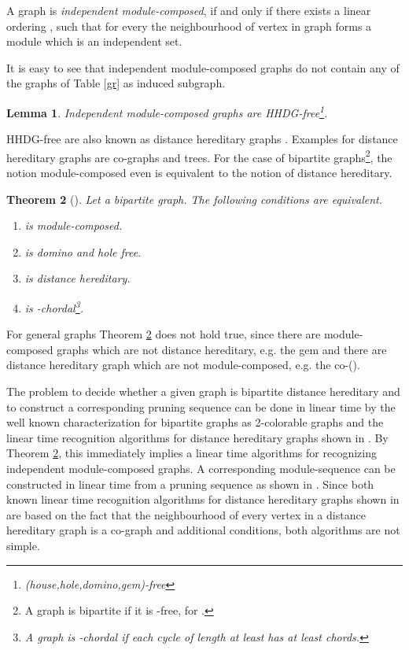 \documentclass[11pt]{article}
\newtheorem{theorem}{Theorem}[section]
\newtheorem{lemma}[theorem]{Lemma}
\begin{document}
A graph  is {\em independent module-composed}, if and only if there exists a linear 
ordering , such that for every  
the neighbourhood of vertex  in graph  
forms a module which is an independent set.



It is easy to see that independent module-composed graphs do not contain
any of the graphs of Table \ref{gr} as induced subgraph.


\begin{lemma}
Independent module-composed graphs are HHDG-free\footnote{(house,hole,domino,gem)-free}.
\end{lemma}

HHDG-free are also known as distance hereditary graphs \cite{HM90,BM86}.
Examples for distance hereditary graphs are co-graphs and trees.
For the case of bipartite graphs\footnote{A graph is bipartite if it is -free, for .}, the notion module-composed 
even is equivalent to the notion of distance hereditary. 

\begin{theorem}[\cite{AGKKW06}]\label{bipm}  Let  a bipartite graph. The following conditions are equivalent.
\begin{enumerate}
\item  is module-composed.

\item  is domino and hole free.

\item  is distance hereditary.

\item  is   -chordal\footnote{ A graph is -chordal if each cycle
of length at least  has at least  chords.}.
\end{enumerate}
\end{theorem}

For general graphs Theorem \ref{bipm} does not hold true, since 
there are module-composed graphs which are not distance hereditary, e.g. the gem and there
are  distance hereditary graph which are not module-composed, e.g. the
co-().










\bigskip
The problem to decide whether a given graph is bipartite distance hereditary
and to construct a corresponding pruning sequence can be done in linear time
by the well known characterization for bipartite graphs as 2-colorable graphs and
the linear time recognition algorithms for distance hereditary graphs shown in \cite{HM90,BM86}.
By Theorem \ref{bipm}, this immediately implies a linear time algorithms for recognizing
independent module-composed graphs. A corresponding module-sequence can be constructed 
in linear time from a pruning sequence as shown in \cite{AGKKW06}.
Since both known linear time recognition algorithms for distance hereditary graphs shown 
in \cite{HM90,BM86} are based on the fact that the neighbourhood of every vertex in 
a  distance hereditary graph is a co-graph and additional conditions, both algorithms 
are not simple.
\end{document}
